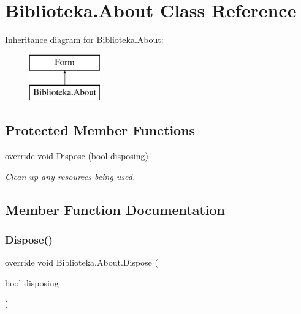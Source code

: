 \hypertarget{class_biblioteka_1_1_about}{}\section{Biblioteka.\+About Class Reference}
\label{class_biblioteka_1_1_about}
Inheritance diagram for Biblioteka.\+About\+:\begin{figure}[H]
\begin{center}
\leavevmode
\includegraphics[height=2.000000cm]{class_biblioteka_1_1_about}
\end{center}
\end{figure}
\subsection*{Protected Member Functions}
\begin{DoxyCompactItemize}
\item 
override void \hyperlink{class_biblioteka_1_1_about_ae46b736c38521c1c20e00fad6979cdf9}{Dispose} (bool disposing)
\begin{DoxyCompactList}\small\item\em Clean up any resources being used. \end{DoxyCompactList}\end{DoxyCompactItemize}


\subsection{Member Function Documentation}
\mbox{\label{class_biblioteka_1_1_about_ae46b736c38521c1c20e00fad6979cdf9}} 
\subsubsection{\texorpdfstring{Dispose()}{Dispose()}}
{\footnotesize\ttfamily override void Biblioteka.\+About.\+Dispose (\begin{DoxyParamCaption}\item[{bool}]{disposing }\end{DoxyParamCaption})\hspace{0.3cm}{\ttfamily [protected]}}



